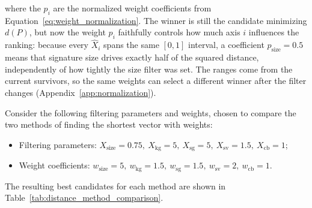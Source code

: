where the $p_i$ are the normalized weight coefficients from Equation~\eqref{eq:weight_normalization}.
The winner is still the candidate minimizing $d(P)$, but now the weight $p_i$ faithfully controls how much axis $i$ influences the ranking: because every $\widehat{X}_i$ spans the same $[0, 1]$ interval, a coefficient $p_{\text{size}} = 0.5$ means that signature size drives exactly half of the squared distance, independently of how tightly the size filter was set.
The ranges come from the current survivors, so the same weights can select a different winner after the filter changes (Appendix~\ref{app:normalization}).

Consider the following filtering parameters and weights, chosen to compare the two methods of finding the shortest vector with weights:

\begin{itemize}
    \item Filtering parameters: $X_{\text{size}} = 0.75, \ X_{\text{kg}} = 5, \ X_{\text{sg}} = 5, \ X_{\text{sv}} = 1.5, \ X_{\text{cb}} = 1$;
    \item Weight coefficients: $w_{\text{size}} = 5, \ w_{\text{kg}} = 1.5, \ w_{\text{sg}} = 1.5, \ w_{\text{sv}} = 2, \ w_{\text{cb}} = 1$.
\end{itemize}

The resulting best candidates for each method are shown in Table~\ref{tab:distance_method_comparison}.

\begin{table}[htbp]
\centering
\small
\raggedright
\caption{Comparison between the Best Candidates under the Regular Weighted and Metric-Normalized Weighted Distance Criteria}
\label{tab:distance_method_comparison}
\end{table}

